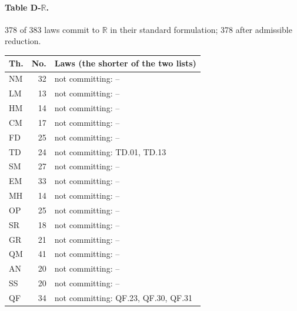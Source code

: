 \paragraph{Table D-$\mathbb R$.} 378 of 383 laws commit to $\mathbb R$ in their standard formulation; 378 after admissible reduction.
{\scriptsize\setlength{\tabcolsep}{3pt}
\begin{longtable}{l r p{12.2cm}}
\toprule
Th. & No. & Laws (the shorter of the two lists) \\
\midrule
\endhead
\bottomrule\endfoot
NM & 32 & not committing: -- \\
LM & 13 & not committing: -- \\
HM & 14 & not committing: -- \\
CM & 17 & not committing: -- \\
FD & 25 & not committing: -- \\
TD & 24 & not committing: TD.01, TD.13 \\
SM & 27 & not committing: -- \\
EM & 33 & not committing: -- \\
MH & 14 & not committing: -- \\
OP & 25 & not committing: -- \\
SR & 18 & not committing: -- \\
GR & 21 & not committing: -- \\
QM & 41 & not committing: -- \\
AN & 20 & not committing: -- \\
SS & 20 & not committing: -- \\
QF & 34 & not committing: QF.23, QF.30, QF.31 \\
\end{longtable}
}
